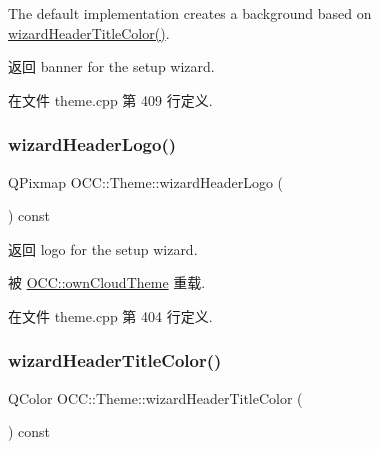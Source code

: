 The default implementation creates a background based on \hyperlink{class_o_c_c_1_1_theme_ac819e011427048af3c7e50ad34f6f77f}{wizard\+Header\+Title\+Color()}.

\begin{DoxyReturn}{返回}
banner for the setup wizard. 
\end{DoxyReturn}


在文件 theme.\+cpp 第 409 行定义.

\mbox{\label{class_o_c_c_1_1_theme_a6263d9c402834d60ce0fd6ee71b5cbbe}} 
\subsubsection{\texorpdfstring{wizard\+Header\+Logo()}{wizardHeaderLogo()}}
{\footnotesize\ttfamily Q\+Pixmap O\+C\+C\+::\+Theme\+::wizard\+Header\+Logo (\begin{DoxyParamCaption}{ }\end{DoxyParamCaption}) const\hspace{0.3cm}{\ttfamily [virtual]}}

\begin{DoxyReturn}{返回}
logo for the setup wizard. 
\end{DoxyReturn}


被 \hyperlink{class_o_c_c_1_1own_cloud_theme_ac9b6d61d21d239bfa4bf156482e63f76}{O\+C\+C\+::own\+Cloud\+Theme} 重载.



在文件 theme.\+cpp 第 404 行定义.

\mbox{\label{class_o_c_c_1_1_theme_ac819e011427048af3c7e50ad34f6f77f}} 
\subsubsection{\texorpdfstring{wizard\+Header\+Title\+Color()}{wizardHeaderTitleColor()}}
{\footnotesize\ttfamily Q\+Color O\+C\+C\+::\+Theme\+::wizard\+Header\+Title\+Color (\begin{DoxyParamCaption}{ }\end{DoxyParamCaption}) const\hspace{0.3cm}{\ttfamily [virtual]}}


